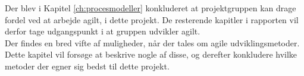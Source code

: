 Der blev i Kapitel \ref{ch:procesmodeller} konkluderet at projektgruppen kan drage fordel ved at
arbejde agilt, i dette projekt. De resterende kapitler i rapporten vil derfor tage udgangspunkt i at gruppen
udvikler agilt. \\ 

Der findes en bred vifte af muligheder, når der tales om agile udviklingsmetoder. Dette kapitel vil forsøge 
at beskrive nogle af disse, og derefter konkludere hvilke metoder der egner sig bedst til dette projekt.